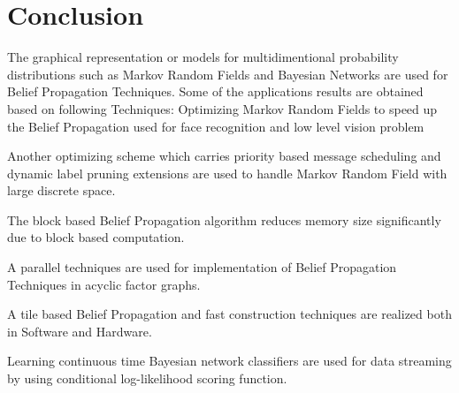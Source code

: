 \chapter{Conclusion}


The graphical representation or models for multidimentional probability distributions such as Markov  Random Fields and  Bayesian Networks are used for Belief Propagation Techniques.
Some of the applications results are obtained based on following Techniques:
Optimizing Markov  Random Fields to speed up the  Belief Propagation used for face recognition and low level vision problem

Another optimizing scheme which carries priority based message scheduling and dynamic label pruning extensions are used to handle  Markov  Random Field with large discrete space.

The block based Belief Propagation algorithm reduces memory size significantly due to block based computation.

A parallel techniques are used for implementation of Belief Propagation Techniques in acyclic  factor graphs.

A tile based Belief Propagation and fast construction techniques are realized both in Software and Hardware.

Learning continuous time Bayesian network classifiers are used for data streaming by using conditional log-likelihood scoring function.


